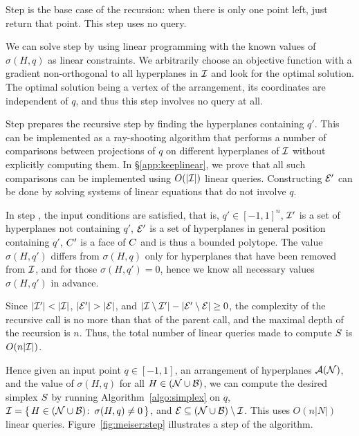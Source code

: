 Step  is the base case of the recursion: when there is only one point left,
just return that point. This step uses no query.

We can solve step  by using linear programming with the known values
of \(\sigma(H,q)\) as linear constraints. We arbitrarily choose an
objective function with a gradient non-orthogonal to all hyperplanes in
\(\mathcal{I}\) and look for the optimal solution. The optimal solution being a vertex of the arrangement,
its coordinates are independent of \(q\), and thus this step involves no query at all.

Step  prepares the recursive step by finding the hyperplanes containing
\(q'\). This can be implemented as a ray-shooting algorithm that performs
a number of comparisons between projections of $q$ on different hyperplanes of $\mathcal{I}$ without
explicitly computing them. In \S\ref{app:keeplinear}, we prove that all such comparisons
can be implemented using \(O(|{\mathcal{I}}|)\) linear queries.
Constructing \(\mathcal{E}'\) can be done by solving systems of linear
equations that do not involve \(q\).

In step , the input conditions are satisfied, that is, $q' \in
{[-1,1]}^n$, \(\mathcal{I}'\) is a set of hyperplanes not containing \(q'\), \(\mathcal{E}'\) is
a set of hyperplanes in general position containing \(q'\), \(C'\) is a
face of \(C\) and is thus a bounded polytope. The value \(\sigma(H,q')\)
differs from \(\sigma(H,q)\) only for hyperplanes that have been removed from
\(\mathcal{I}\), and for those \(\sigma(H,q') = 0\), hence we know all necessary values
\(\sigma(H,q')\) in advance.

Since \(|{\mathcal{I}'}| < |{\mathcal{I}}|\), \(|{\mathcal{E}'}| > |{\mathcal{E}}|\), and
\(|{\mathcal{I}\setminus\mathcal{I}'}| - |{\mathcal{E}'\setminus\mathcal{E}}| \ge 0\), the complexity of the
recursive call is no more than that of the parent call, and the maximal depth
of the recursion is \(n\). Thus, the total number of
linear queries made to compute \(S\) is \(O(n|{\mathcal{I}}|)\).

Hence given an input point \(q \in [-1,1]\), an arrangement of hyperplanes
\(\mathcal{A}(\mathcal{N})\), and the value of \(\sigma(H,q)\) for all
\(H \in (\mathcal{N}\cup\mathcal{B})\), we can compute the desired simplex \(S\)
by running Algorithm~\ref{algo:simplex} on \(q\),
\(\mathcal{I}=\{\,H \in (\mathcal{N}\cup\mathcal{B}) \colon\, \sigma(H,q) \neq 0\,\}\), and
\(\mathcal{E} \subseteq (\mathcal{N}\cup\mathcal{B}) \setminus\mathcal{I}\).
This uses $O( n | N | )$ linear queries.
Figure~\ref{fig:meiser:step} illustrates a step of the algorithm.


